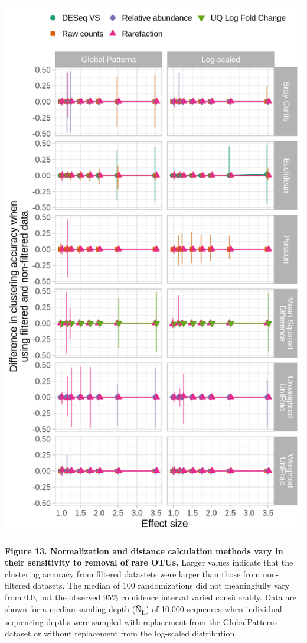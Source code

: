 \documentclass[
]{article}
\begin{document}
\includegraphics{figure_13.png}

\textbf{Figure 13. Normalization and distance calculation methods vary
in their sensitivity to removal of rare OTUs.} Larger values indicate
that the clustering accuracy from filtered datastets were larger than
those from non-filtered datasets. The median of 100 randomizations did
not meaningfully vary from 0.0, but the observed 95\% confidence
interval varied considerably. Data are shown for a median samling depth
(Ñ\textsubscript{L}) of 10,000 sequences when individual sequencing
depths were sampled with replacement from the GlobalPatterns dataset or
without replacement from the log-scaled distribution.
\end{document}
